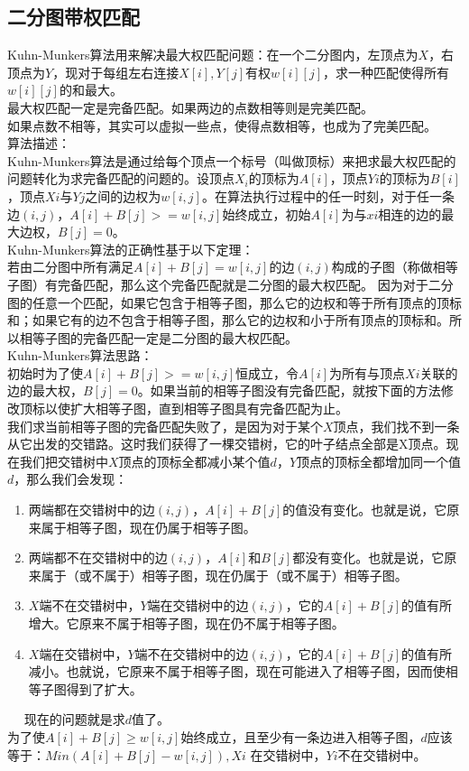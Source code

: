 \subsection{二分图带权匹配}
Kuhn-Munkers算法用来解决最大权匹配问题：在一个二分图内，左顶点为$X$，右顶点为$Y$，现对于每组左右连接$X[i],Y[j]$有权$w[i][j]$，求一种匹配使得所有$w[i][j]$的和最大。 \\
最大权匹配一定是完备匹配。如果两边的点数相等则是完美匹配。 \\
如果点数不相等，其实可以虚拟一些点，使得点数相等，也成为了完美匹配。\\

算法描述： \\
Kuhn-Munkers算法是通过给每个顶点一个标号（叫做顶标）来把求最大权匹配的问题转化为求完备匹配的问题的。设顶点$X_i$的顶标为$A[i]$，顶点$Yi$的顶标为$B[i]$，顶点$Xi$与$Yj$之间的边权为$w[i,j]$。在算法执行过程中的任一时刻，对于任一条边$(i,j)$，$A[i]+B[j]>=w[i,j]$始终成立，初始$A[i]$为与$xi$相连的边的最大边权，$B[j]=0$。 \\

Kuhn-Munkers算法的正确性基于以下定理： \\
若由二分图中所有满足$A[i]+B[j]=w[i,j]$的边$(i,j)$构成的子图（称做相等子图）有完备匹配，那么这个完备匹配就是二分图的最大权匹配。
因为对于二分图的任意一个匹配，如果它包含于相等子图，那么它的边权和等于所有顶点的顶标和；如果它有的边不包含于相等子图，那么它的边权和小于所有顶点的顶标和。所以相等子图的完备匹配一定是二分图的最大权匹配。\\

Kuhn-Munkers算法思路： \\
初始时为了使$A[i]+B[j]>=w[i,j]$恒成立，令$A[i]$为所有与顶点$Xi$关联的边的最大权，$B[j]=0$。如果当前的相等子图没有完备匹配，就按下面的方法修改顶标以使扩大相等子图，直到相等子图具有完备匹配为止。 \\
我们求当前相等子图的完备匹配失败了，是因为对于某个$X$顶点，我们找不到一条从它出发的交错路。这时我们获得了一棵交错树，它的叶子结点全部是X顶点。现在我们把交错树中$X$顶点的顶标全都减小某个值$d$，$Y$顶点的顶标全都增加同一个值$d$，那么我们会发现：
\begin{enumerate}
\item 两端都在交错树中的边$(i,j)$，$A[i]+B[j]$的值没有变化。也就是说，它原来属于相等子图，现在仍属于相等子图。
\item 两端都不在交错树中的边$(i,j)$，$A[i]$和$B[j]$都没有变化。也就是说，它原来属于（或不属于）相等子图，现在仍属于（或不属于）相等子图。
\item $X$端不在交错树中，$Y$端在交错树中的边$(i,j)$，它的$A[i]+B[j]$的值有所增大。它原来不属于相等子图，现在仍不属于相等子图。
\item $X$端在交错树中，$Y$端不在交错树中的边$(i,j)$，它的$A[i]+B[j]$的值有所减小。也就说，它原来不属于相等子图，现在可能进入了相等子图，因而使相等子图得到了扩大。
\end{enumerate}　
现在的问题就是求$d$值了。\\
为了使$A[i]+B[j]\geq w[i,j]$始终成立，且至少有一条边进入相等子图，$d$应该等于：$Min(A[i]+B[j]-w[i,j]),Xi$ 在交错树中，$Yi$不在交错树中。 \\

